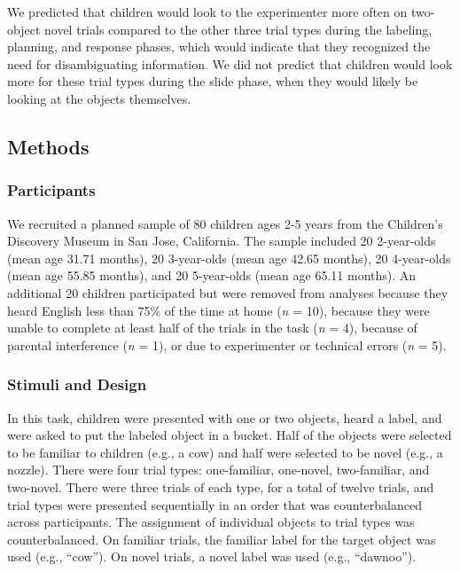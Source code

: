 \documentclass[10pt, letterpaper]{article}
\begin{document}
We predicted that children would look to the experimenter more often on
two-object novel trials compared to the other three trial types during
the labeling, planning, and response phases, which would indicate that
they recognized the need for disambiguating information. We did not
predict that children would look more for these trial types during the
slide phase, when they would likely be looking at the objects
themselves.

\subsection{Methods}\label{methods}

\subsubsection{Participants}\label{participants}

We recruited a planned sample of 80 children ages 2-5 years from the
Children's Discovery Museum in San Jose, California. The sample included
20 2-year-olds (mean age 31.71 months), 20 3-year-olds (mean age 42.65
months), 20 4-year-olds (mean age 55.85 months), and 20 5-year-olds
(mean age 65.11 months). An additional 20 children participated but were
removed from analyses because they heard English less than 75\% of the
time at home (\emph{n} = 10), because they were unable to complete at
least half of the trials in the task (\emph{n} = 4), because of parental
interference (\emph{n} = 1), or due to experimenter or technical errors
(\emph{n} = 5).

\subsubsection{Stimuli and Design}\label{stimuli-and-design}

In this task, children were presented with one or two objects, heard a
label, and were asked to put the labeled object in a bucket. Half of the
objects were selected to be familiar to children (e.g., a cow) and half
were selected to be novel (e.g., a nozzle). There were four trial types:
one-familiar, one-novel, two-familiar, and two-novel. There were three
trials of each type, for a total of twelve trials, and trial types were
presented sequentially in an order that was counterbalanced across
participants. The assignment of individual objects to trial types was
counterbalanced. On familiar trials, the familiar label for the target
object was used (e.g., ``cow''). On novel trials, a novel label was used
(e.g., ``dawnoo'').
\end{document}
